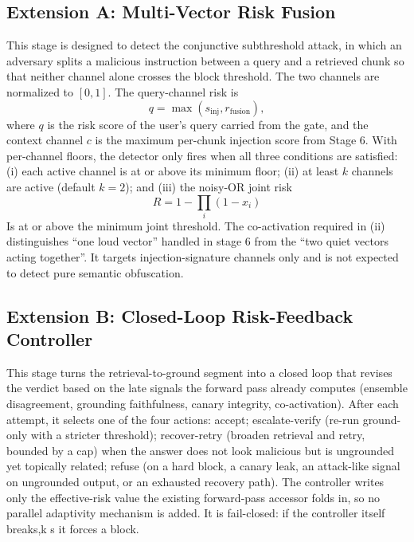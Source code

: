 \documentclass[conference]{IEEEtran}
\begin{document}
\subsection{Extension A: Multi-Vector Risk Fusion}
This stage is designed to detect the conjunctive subthreshold attack, in which an adversary splits a malicious instruction between a query and a retrieved chunk so that neither channel alone crosses the block threshold. The two channels are normalized to $[0,1]$. The query-channel risk is
\begin{equation}
q = \max\left(s_{\mathrm{inj}}, r_{\mathrm{fusion}}\right),
\end{equation}
where $q$ is the risk score of the user's query carried from the gate, and the context channel $c$ is the maximum per-chunk injection score from Stage 6. With per-channel floors, the detector only fires when all three conditions are satisfied: (i) each active channel is at or above its minimum floor; (ii) at least $k$ channels are active (default $k=2$); and (iii) the noisy-OR joint risk
\begin{equation}
R = 1 - \prod_i (1 - x_i)
\end{equation}
Is at or above the minimum joint threshold. The co-activation required in (ii) distinguishes ``one loud vector'' handled in stage 6 from the ``two quiet vectors acting together''. It targets injection-signature channels only and is not expected to detect pure semantic obfuscation.

\subsection{Extension B: Closed-Loop Risk-Feedback Controller}
This stage turns the retrieval-to-ground segment into a closed loop that revises the verdict based on the late signals the forward pass already computes (ensemble disagreement, grounding faithfulness, canary integrity, co-activation). After each attempt, it selects one of the four actions: accept; escalate-verify (re-run ground-only with a stricter threshold); recover-retry (broaden retrieval and retry, bounded by a cap) when the answer does not look malicious but is ungrounded yet topically related; refuse (on a hard block, a canary leak, an attack-like signal on ungrounded output, or an exhausted recovery path). The controller writes only the effective-risk value the existing forward-pass accessor folds in, so no parallel adaptivity mechanism is added. It is fail-closed: if the controller itself breaks,k s it forces a block.
\end{document}
